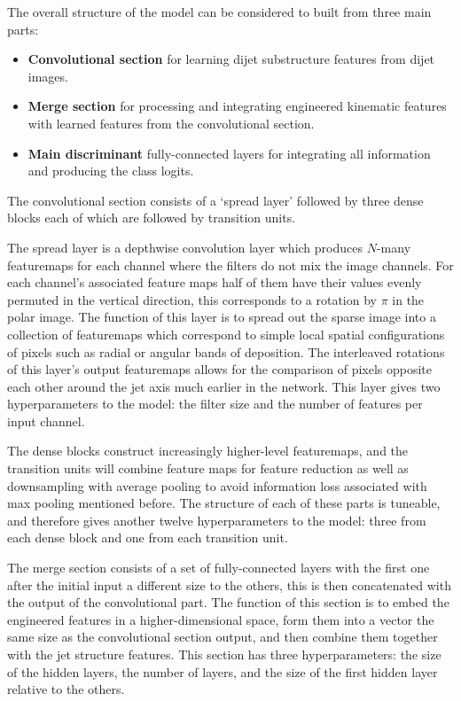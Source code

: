 The overall structure of the model can be considered to built from three main parts:
\begin{itemize}[leftmargin=.5in,noitemsep]
    \item \textbf{Convolutional section} for learning dijet substructure features from dijet images.
    \item \textbf{Merge section} for processing and integrating engineered kinematic features with learned features from the convolutional section.
    \item \textbf{Main discriminant} fully-connected layers for integrating all information and producing the class logits.
\end{itemize}


The convolutional section consists of a `spread layer' followed by three dense blocks each of which are followed by transition units.

The spread layer is a depthwise convolution layer which produces $N$-many featuremaps for each channel where the filters do not mix the image channels. 
For each channel's associated feature maps half of them have their values evenly permuted in the vertical direction, this corresponds to a rotation by $\pi$ in the polar image.
The function of this layer is to spread out the sparse image into a collection of featuremaps which correspond to simple local spatial configurations of pixels such as radial or angular bands of deposition. 
The interleaved rotations of this layer's output featuremaps allows for the comparison of pixels opposite each other around the jet axis much earlier in the network.  
This layer gives two hyperparameters to the model: the filter size and the number of features per input channel.

The dense blocks construct increasingly higher-level featuremaps, and the transition units will combine feature maps for feature reduction as well as downsampling with average pooling to avoid information loss associated with max pooling mentioned before.  
The structure of each of these parts is tuneable, and therefore gives another twelve hyperparameters to the model: three from each dense block and one from each transition unit. 

The merge section consists of a set of fully-connected layers with the first one after the initial input a different size to the others, this is then concatenated with the output of the convolutional part.
The function of this section is to embed the engineered features in a higher-dimensional space, form them into a vector the same size as the convolutional section output, and then combine them together with the jet structure features. This section has three hyperparameters: the size of the hidden layers, the number of layers, and the size of the first hidden layer relative to the others. 



